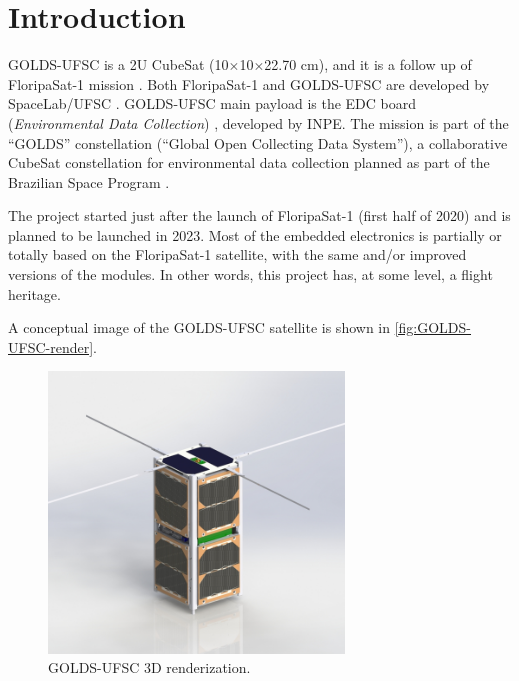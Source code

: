 %
%
%
%
%

%
%
%
%
%
%

\chapter{Introduction} \label{ch:introduction}

GOLDS-UFSC is a 2U CubeSat (10$\times$10$\times$22.70 cm), and it is a follow up of FloripaSat-1 mission \cite{floripasat}. Both FloripaSat-1 and GOLDS-UFSC are developed by SpaceLab/UFSC \cite{spacelab}. GOLDS-UFSC main payload is the EDC board (\textit{Environmental Data Collection}) \cite{edc}, developed by INPE. The mission is part of the ``GOLDS'' constellation (``Global Open Collecting Data System''), a collaborative CubeSat constellation for environmental data collection planned as part of the Brazilian Space Program \cite{golds}.

The project started just after the launch of FloripaSat-1 (first half of 2020) and is planned to be launched in 2023. Most of the embedded electronics is partially or totally based on the FloripaSat-1 satellite, with the same and/or improved versions of the modules. In other words, this project has, at some level, a flight heritage.

A conceptual image of the GOLDS-UFSC satellite is shown in \autoref{fig:GOLDS-UFSC-render}.

\begin{figure}[!ht]
    \begin{center}
        \includegraphics[width=0.7\textwidth]{figures/floripasat-2.jpg}
        \caption{GOLDS-UFSC 3D renderization.}
        \label{fig:GOLDS-UFSC-render}
    \end{center}
\end{figure}

